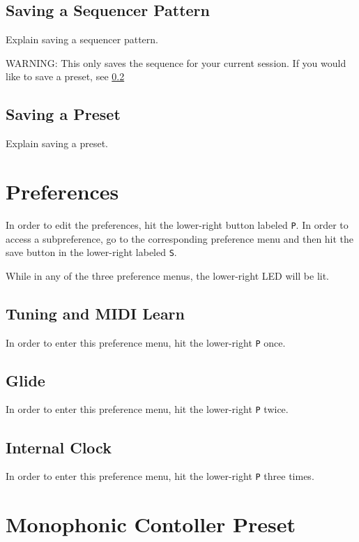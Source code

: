 \subsection{Saving a Sequencer Pattern}

  Explain saving a sequencer pattern.

  WARNING: This only saves the sequence for your current session.
  If you would like to save a preset, see \ref{refSavingPreset}

\subsection{Saving a Preset} \label{refSavingPreset}

  Explain saving a preset.




\section{Preferences}

  In order to edit the preferences, hit the lower-right button labeled \texttt{P}.
  In order to access a subpreference, go to the corresponding preference menu
  and then hit the save button in the lower-right labeled \texttt{S}.

  While in any of the three preference menus, the lower-right LED will be lit.

  \subsection{Tuning and MIDI Learn}

  In order to enter this preference menu, hit the lower-right \texttt{P} once.

  \subsection{Glide}

  In order to enter this preference menu, hit the lower-right \texttt{P} twice.

  \subsection{Internal Clock}\label{refInternalClock}

  In order to enter this preference menu, hit the lower-right \texttt{P} three times.


\section{Monophonic Contoller Preset}

